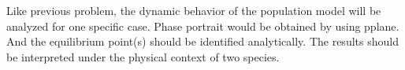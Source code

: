 Like previous problem, the dynamic behavior of the population model will be analyzed for one specific case. Phase portrait would be obtained by using pplane. And the equilibrium point(s) should be identified analytically. The results should be interpreted under the physical context of two species. 
